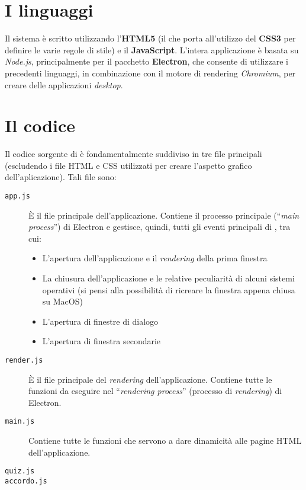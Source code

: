 \section{I linguaggi}
Il sistema \ProjectTitle{} è scritto utilizzando l'\textbf{HTML5} (il che porta
all'utilizzo del \textbf{CSS3} per definire le varie regole di stile) e il
\textbf{JavaScript}. L'intera applicazione è basata su \emph{Node.js},
principalmente per il pacchetto \textbf{Electron}, che consente di utilizzare i
precedenti linguaggi, in combinazione con il motore di rendering
\emph{Chromium}, per creare delle applicazioni \textit{desktop}.

\section{Il codice}
Il codice sorgente di \ProjectTitle{} è fondamentalmente suddiviso in tre file
principali (escludendo i file HTML e CSS utilizzati per creare l'aspetto grafico
dell'aplicazione). Tali file sono:
\begin{description}
	\item[\texttt{app.js}] È il file principale dell'applicazione. Contiene il
	processo principale (``\emph{main process}'') di Electron e gestisce,
	quindi, tutti gli eventi principali di \ProjectTitle{}, tra cui:
	\begin{itemize}
		\item L'apertura dell'applicazione e il \emph{rendering} della prima
		finestra
		\item La chiusura dell'applicazione e le relative peculiarità di alcuni
		sistemi operativi (si pensi alla possibilità di ricreare la finestra
		appena chiusa su MacOS)
		\item L'apertura di finestre di dialogo
		\item L'apertura di finestra secondarie
	\end{itemize} 
	\item[\texttt{render.js}] È il file principale del \emph{rendering}
	dell'applicazione. Contiene tutte le funzioni da eseguire nel
	``\emph{rendering process}'' (processo di \emph{rendering}) di Electron.
	\item[\texttt{main.js}] Contiene tutte le funzioni che servono a dare
	dinamicità alle pagine HTML dell'applicazione.
	\item[\texttt{quiz.js}]
	\item[\texttt{accordo.js}]
\end{description}